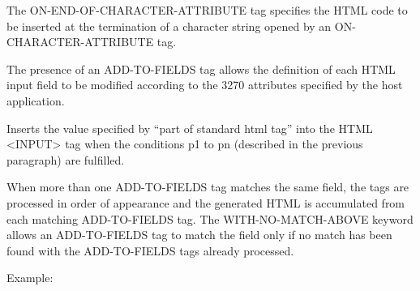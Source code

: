 \documentclass[letterpaper,10pt,english]{sphinxmanual}
\begin{document}

The ON-END-OF-CHARACTER-ATTRIBUTE tag specifies the HTML code to be inserted at the termination of a character
string opened by an ON-CHARACTER-ATTRIBUTE tag.

\begin{sphinxVerbatim}[commandchars=\\\{\}]
     
\end{sphinxVerbatim}


The presence of an ADD-TO-FIELDS tag allows the definition of each HTML input field to be modified according to the 3270 attributes specified by the host application.

\begin{sphinxVerbatim}[commandchars=\\\{\}]
        
\end{sphinxVerbatim}

Inserts the value specified by “part of standard html tag” into the HTML \textless{}INPUT\textgreater{} tag when the conditions p1 to pn
(described in the previous paragraph) are fulfilled.

When more than one ADD-TO-FIELDS tag matches the same field, the tags are processed in order of appearance and
the generated HTML is accumulated from each matching ADD-TO-FIELDS tag. The WITH-NO-MATCH-ABOVE keyword
allows an ADD-TO-FIELDS tag to match the field only if no match has been found with the ADD-TO-FIELDS tags already
processed.

Example:
\end{document}
